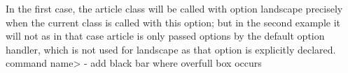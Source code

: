 In the first case, the article class will be called with option landscape precisely when the current class is called with this option; but in the second example it will not as in that case article is only passed options by the default option handler, which is not used for landscape as that option is explicitly declared.
\@onlypreamble\<command name>
\overfullrule=2cm
-	add black bar where overfull box occurs


